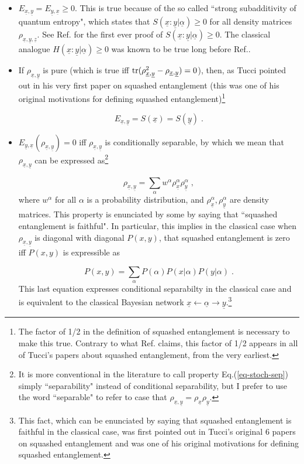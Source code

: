 \documentclass[12pt]{article}%
\newcommand{\tr}[0]{{\rm tr }}
\newcommand{\beq}{\begin{equation}}
\newcommand{\eeq}{\end{equation}}
\newcommand{\ul}[1]{\underline{#1}}
\newcommand{\rvx}[0]{{\ul{x}}}
\newcommand{\rvy}[0]{{\ul{y}}}
\newcommand{\rvz}[0]{{\ul{z}}}
\newcommand{\rvalp}[0]{{\ul{\alpha}}}
\newcommand{\alp}[0]{{\alpha}}
\begin{document}
\begin{itemize}
\item
$E_{\rvx, \rvy} = E_{\rvy, \rvx}\geq 0$. This is true
because of the so called ``strong subadditivity
of quantum entropy", which states that
$S(\rvx : \rvy|\rvalp)\geq 0$
for all density matrices
$\rho_{\rvx,\rvy, \rvz}$.
See Ref.\cite{subadd-proof}
for the first ever proof of $S(\rvx : \rvy|\rvalp)\geq 0$.
The classical analogue $H(\rvx : \rvy|\rvalp)\geq 0$
was known to be true long before Ref.\cite{subadd-proof}.

\item
If $\rho_{\rvx, \rvy}$ is pure (which is true iff
$\tr( \rho_{\rvx, \rvy}^2 - \rho_{\rvx, \rvy}) = 0$), then, as
Tucci pointed out in his very first paper on squashed entanglement
(this was one of his original motivations
for defining squashed entanglement)\footnote{ The factor of 1/2 in
the definition of squashed entanglement
is necessary to make this true.
Contrary to what Ref.\cite{sep-proof2} claims,
this factor
of 1/2 appears in all of Tucci's
 papers about squashed entanglement,
from the very earliest.}

\beq
E_{\rvx, \rvy} = S(\rvx) = S(\rvy)
\;.
\eeq

\item
$E_{\rvy, \rvx}(\rho_{\rvx, \rvy})= 0$ iff
$\rho_{\rvx, \rvy}$
is conditionally separable,
by which we mean that $\rho_{\rvx, \rvy}$
can be expressed as\footnote{
It is more conventional in the literature to call
property Eq.(\ref{eq-stoch-sep})
simply ``separability" instead of conditional
separability, but I prefer to use the word
``separable" to refer to case that
$\rho_{\rvx,\rvy} = \rho_\rvx \rho_\rvy$.}

\beq
\rho_{\rvx,\rvy}= \sum_\alp w^\alp
\rho^\alp_\rvx \rho^\alp_\rvy
\;,
\label{eq-stoch-sep}
\eeq
where $w^\alp$ for all $\alp$
is a probability distribution,
and $\rho_\rvx^\alp, \rho_\rvy^\alp$
are density matrices.
This property is enunciated by some by saying that
``squashed entanglement is faithful".
In particular,
this implies
in the classical case when
$\rho_{\rvx,\rvy}$ is diagonal with diagonal
$P(x, y)$, that squashed entanglement is zero iff
$P(x,y)$ is expressible as

\beq
P(x,y)=\sum_{\alp}P(\alp)P(x|\alp)P(y|\alp)
\;.
\eeq
This last equation expresses conditional separabilty
in the classical case and is equivalent to the classical Bayesian
network $\rvx\leftarrow\rvalp\rightarrow\rvy$.\footnote{This fact, which can be enunciated
by saying that squashed
entanglement is faithful in the classical case, was
first pointed out in Tucci's original 6 papers on squashed entanglement
and was one of his original motivations for defining
squashed entanglement.}



\end{itemize}
\end{document}
